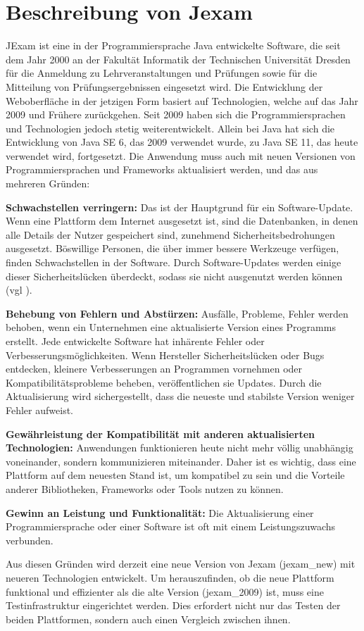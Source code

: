 \section{Beschreibung von Jexam}

JExam ist eine in der Programmiersprache Java entwickelte Software,
die seit dem Jahr 2000 an der Fakult\"at Informatik der Technischen
Universit\"at Dresden für die Anmeldung zu Lehrveranstaltungen und
Pr\"ufungen sowie für die Mitteilung von Pr\"ufungsergebnissen eingesetzt
wird. Die Entwicklung der Weboberfläche in der jetzigen Form basiert
auf Technologien, welche auf das Jahr 2009 und Frühere zur\"uckgehen.
Seit 2009 haben sich die Programmiersprachen und Technologien jedoch
stetig weiterentwickelt. Allein bei Java hat sich die Entwicklung von
Java SE 6, das 2009 verwendet wurde, zu Java SE 11, das heute verwendet
wird, fortgesetzt. Die Anwendung muss auch mit neuen Versionen von
Programmiersprachen und Frameworks aktualisiert werden, und das aus
mehreren Gründen:


\textbf{Schwachstellen verringern:} Das ist der Hauptgrund für ein
Software-Update. Wenn eine Plattform dem Internet ausgesetzt ist,
sind die Datenbanken, in denen alle Details der Nutzer gespeichert
sind, zunehmend Sicherheitsbedrohungen ausgesetzt. Böswillige
Personen, die über immer bessere Werkzeuge verfügen, finden
Schwachstellen in der Software.  Durch Software-Updates werden einige
dieser Sicherheitslücken überdeckt, sodass sie nicht ausgenutzt werden
können (vgl \cite{McAfee2017}).

\textbf{Behebung von Fehlern und Abstürzen:} Ausfälle, Probleme, Fehler
werden behoben, wenn ein Unternehmen eine aktualisierte Version eines
Programms erstellt. Jede entwickelte Software hat inhärente Fehler
oder Verbesserungsmöglichkeiten. Wenn Hersteller Sicherheitslücken
oder Bugs entdecken, kleinere Verbesserungen an Programmen vornehmen
oder Kompatibilitätsprobleme beheben, veröffentlichen sie Updates.
Durch die Aktualisierung wird sichergestellt, dass die neueste und
stabilste Version weniger Fehler aufweist.

\textbf{Gewährleistung der Kompatibilität mit anderen aktualisierten
Technologien:} Anwendungen funktionieren heute nicht mehr völlig unabhängig
voneinander, sondern kommunizieren miteinander. Daher ist es wichtig, dass eine
Plattform auf dem neuesten Stand ist, um kompatibel zu sein und die
Vorteile anderer Bibliotheken, Frameworks oder Tools nutzen zu können.


\textbf{Gewinn an Leistung und Funktionalität:} Die Aktualisierung einer
Programmiersprache oder einer Software ist oft mit einem
Leistungszuwachs verbunden.

Aus diesen Gründen wird derzeit eine neue Version von Jexam (\Gls{jexam_new})
mit neueren Technologien entwickelt. Um herauszufinden, ob die neue
Plattform funktional und effizienter als die alte Version (\Gls{jexam_2009})
ist, muss eine Testinfrastruktur eingerichtet werden. Dies erfordert
nicht nur das Testen der beiden Plattformen, sondern auch einen Vergleich
zwischen ihnen.

